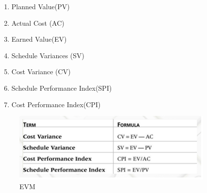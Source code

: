 \begin{enumerate}
\item Planned Value(PV)
\item Actual Cost (AC)
\item Earned Value(EV)
\item Schedule Variances (SV)
\item Cost Variance (CV)
\item Schedule Performance Index(SPI)
\item Cost Performance Index(CPI)
\end{enumerate}

\begin{figure} [H]
\begin{center}
\includegraphics[scale=0.7]{evm.png}
\caption{EVM}
\label{fig:evm}
\end{center}
\end{figure}